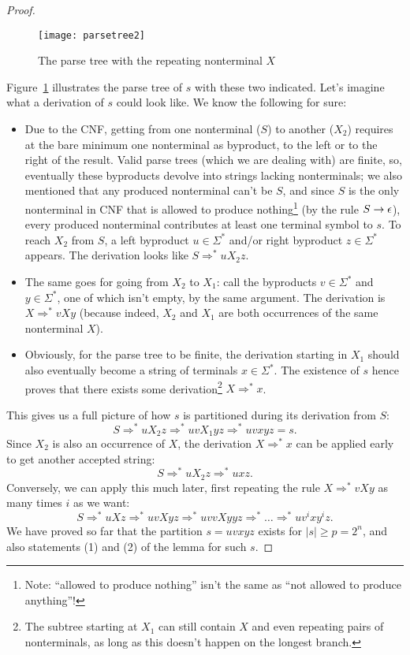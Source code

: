 \begin{proof}
\medskip
\begin{figure}[h]
	\centering
	\texttt{[image: parsetree2]}
	\caption{The parse tree with the repeating nonterminal $X$ \label{parsetree2}}
\end{figure}
\medskip
Figure~\ref{parsetree2} illustrates the parse tree of $s$ with these two indicated. Let's imagine what a derivation of $s$ could look like. We know the following for sure:
\begin{itemize}
	\item Due to the CNF, getting from one nonterminal ($S$) to another ($X_2$) requires at the bare minimum one nonterminal as byproduct, to the left or to the right of the result. Valid parse trees (which we are dealing with) are finite, so, eventually these byproducts devolve into strings lacking nonterminals; we also mentioned that any produced nonterminal can't be $S$, and since $S$ is the only nonterminal in CNF that is allowed to produce nothing\footnote{Note: ``allowed to produce nothing'' isn't the same as ``not allowed to produce anything''!} (by the rule $S\to\epsilon$), every produced nonterminal contributes at least one terminal symbol to $s$. To reach $X_2$ from $S$, a left byproduct $u\in\Sigma^*$ and/or right byproduct $z\in\Sigma^*$ appears. The derivation looks like $S \Rightarrow^* uX_2z$.
	
	\item The same goes for going from $X_2$ to $X_1$: call the byproducts $v\in\Sigma^*$ and $y\in\Sigma^*$, one of which isn't empty, by the same argument. The derivation is $X \Rightarrow^* vXy$ (because indeed, $X_2$ and $X_1$ are both occurrences of the same nonterminal $X$).
	
	\item Obviously, for the parse tree to be finite, the derivation starting in $X_1$ should also eventually become a string of terminals $x\in\Sigma^*$. The existence of $s$ hence proves that there exists some derivation\footnote{The subtree starting at $X_1$ can still contain $X$ and even repeating pairs of nonterminals, as long as this doesn't happen on the longest branch.} $X \Rightarrow^* x$.
\end{itemize}
This gives us a full picture of how $s$ is partitioned during its derivation from $S$:
\begin{equation}
	S \Rightarrow^* uX_2z \Rightarrow^* uvX_1yz \Rightarrow^* uvxyz = s.
\end{equation}
Since $X_2$ is also an occurrence of $X$, the derivation $X \Rightarrow^* x$ can be applied early to get another accepted string:
\begin{equation}
	S \Rightarrow^* uX_2z \Rightarrow^* uxz.
\end{equation}
Conversely, we can apply this much later, first repeating the rule $X \Rightarrow^* vXy$ as many times $i$ as we want:
\begin{equation}
	S \Rightarrow^* uXz \Rightarrow^* uvXyz \Rightarrow^* uvvXyyz \Rightarrow^* \hdots \Rightarrow^* uv^i x y^i z.
\end{equation}
We have proved so far that the partition $s = uvxyz$ exists for $|s| \geq p = 2^n$, and also statements (1) and (2) of the lemma for such $s$.


\end{proof}
